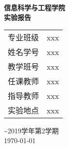 \documentclass[a4paper]{ctexrep}
\begin{document}
	\begin{titlepage} %
		\begin{center}
		{ \kaishu \textbf{信息科学与工程学院}\\[0.5cm]
		\textbf{实验报告}\\[3cm]}

		\vspace*{\fill}
		{\songti
		\begin{tabular}{lc}
			专业班级& xxx\\
			姓名学号& xxx\\
			教学班号& xxx\\
			任课教师& xxx\\
			指导教师& xxx\\
			实验地点& xxx
		\end{tabular}
		}

		\vspace*{\fill}
		{ \textasciitilde 2019学年第2学期}\\[0.5cm]
		{ \songti \today}
		\end{center}
	\end{titlepage}

\tableofcontents %




%











%




\end{document}
